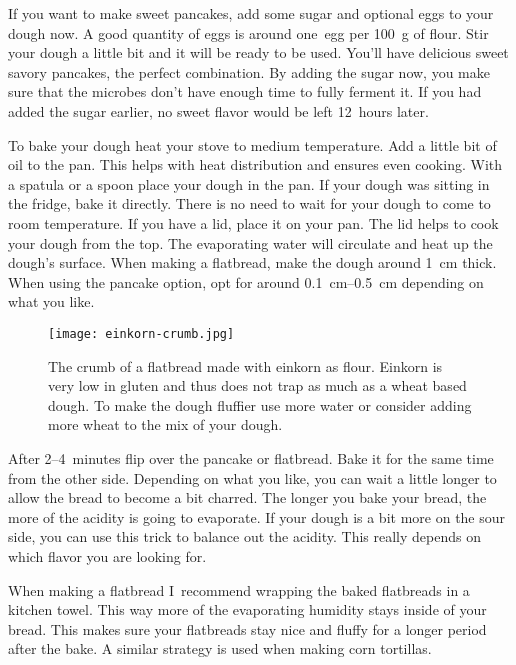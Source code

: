 If you want to make sweet pancakes, add some sugar and optional eggs to your dough
now. A good quantity of eggs is around one~egg per \qty{100}{\gram} of flour.
Stir your dough a little bit and it will be ready to be used. You'll
have delicious sweet savory pancakes, the perfect combination. By
adding the sugar now, you make sure that the microbes don't have
enough time to fully ferment it. If you had added the sugar
earlier, no sweet flavor would be left  12~hours later.

To bake your dough heat your stove to medium temperature. Add a little bit of
oil to the pan. This helps with heat distribution and ensures even cooking.
With a spatula or a spoon place your dough in the pan. If your dough
was sitting in the fridge, bake it directly. There is no need to wait for your
dough to come to room temperature. If you have a lid,
place it on your pan. The lid helps to cook your dough from the top.
The evaporating water will circulate and heat up the dough's surface. When
making a flatbread, make the dough around \qty{1}{\cm} thick. When using the
pancake option, opt for around \qtyrange{0.1}{0.5}{\cm} depending on what you
like.

\begin{figure}[htb!]
\begin{center}
  \texttt{[image: einkorn-crumb.jpg]}
  \caption[Einkorn crum]{The crumb of a flatbread made with einkorn as flour.
      Einkorn is very low in gluten and thus does not trap as much  as
      a wheat based dough. To make the dough fluffier use more water or
      consider adding more wheat to the mix of your dough.}
\end{center}
\end{figure}

After 2--4~minutes flip over the pancake or flatbread. Bake it for the same
time from the other side. Depending on what you like, you can wait a little
longer to allow the bread to become a bit charred. The longer you
bake your bread, the more of the acidity is going to evaporate. If your
dough is a bit more on the sour side, you can use this trick to balance
out the acidity. This really depends on which flavor you are looking for.

When making a flatbread I~recommend wrapping the baked flatbreads
in a kitchen towel. This way more of the evaporating humidity
stays inside of your bread. This makes sure your flatbreads stay
nice and fluffy for a longer period after the bake. A similar strategy is
used when making corn tortillas.

